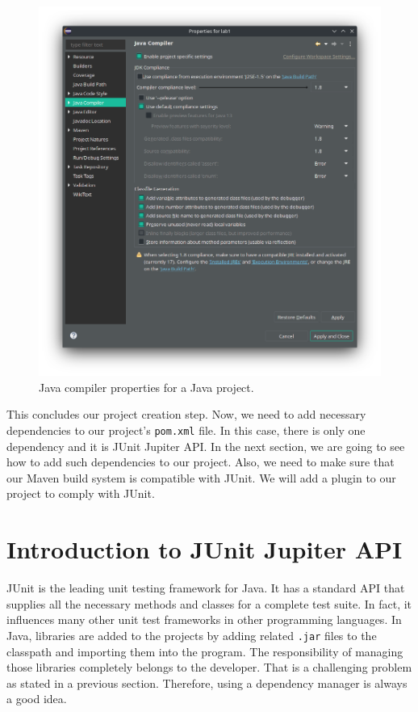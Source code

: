 \begin{figure}[H]
    \centering
    \includegraphics[width=\textwidth]{images/java-version.png}
    \caption{Java compiler properties for a Java project.}
    \label{fig:java-version}
\end{figure}

This concludes our project creation step. Now, we need to add necessary dependencies to our project's \verb|pom.xml| file. In this case, there is only one dependency and it is JUnit Jupiter API. In the next section, we are going to see how to add such dependencies to our project. Also, we need to make sure that our Maven build system is compatible with JUnit. We will add a plugin to our project to comply with JUnit.

\section{Introduction to JUnit Jupiter API}
JUnit is the leading unit testing framework for Java. It has a standard API that supplies all the necessary methods and classes for a complete test suite. In fact, it influences many other unit test frameworks in other programming languages. In Java, libraries are added to the projects by adding related \verb|.jar| files to the classpath and importing them into the program. The responsibility of managing those libraries completely belongs to the developer. That is a challenging problem as stated in a previous section. Therefore, using a dependency manager is always a good idea.

